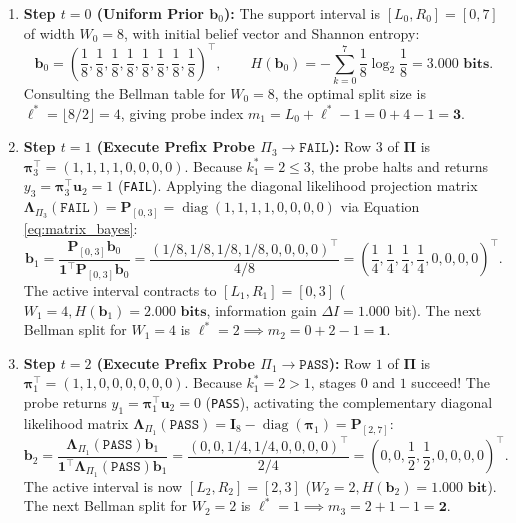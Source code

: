 \documentclass[11pt,a4paper]{article}
\theoremstyle{definition}
\theoremstyle{remark}
\begin{document}
\begin{enumerate}
    \item \textbf{Step $t=0$ (Uniform Prior $\bm{b}_0$):}
    The support interval is $[L_0, R_0] = [0, 7]$ of width $W_0 = 8$, with initial belief vector and Shannon entropy:
    \begin{equation}
        \bm{b}_0 = \left(\frac{1}{8}, \frac{1}{8}, \frac{1}{8}, \frac{1}{8}, \frac{1}{8}, \frac{1}{8}, \frac{1}{8}, \frac{1}{8}\right)^\top, \qquad H(\bm{b}_0) = -\sum_{k=0}^{7} \frac{1}{8}\log_2\frac{1}{8} = \mathbf{3.000\text{ bits}}.
    \end{equation}
    Consulting the Bellman table for $W_0 = 8$, the optimal split size is $\ell^* = \lfloor 8/2 \rfloor = 4$, giving probe index $m_1 = L_0 + \ell^* - 1 = 0 + 4 - 1 = \mathbf{3}$.

    \item \textbf{Step $t=1$ (Execute Prefix Probe $\Pi_3 \to \texttt{FAIL}$):}
    Row $3$ of $\mathbf{\Pi}$ is $\bm{\pi}_3^\top = (1, 1, 1, 1, 0, 0, 0, 0)$. Because $k_1^* = 2 \le 3$, the probe halts and returns $y_3 = \bm{\pi}_3^\top \bm{u}_2 = 1$ (\texttt{FAIL}). Applying the diagonal likelihood projection matrix $\mathbf{\Lambda}_{\Pi_3}(\texttt{FAIL}) = \mathbf{P}_{[0,3]} = \operatorname{diag}(1, 1, 1, 1, 0, 0, 0, 0)$ via Equation \eqref{eq:matrix_bayes}:
    \begin{equation}
        \bm{b}_1 = \frac{\mathbf{P}_{[0,3]} \bm{b}_0}{\bm{1}^\top \mathbf{P}_{[0,3]} \bm{b}_0} = \frac{(1/8, 1/8, 1/8, 1/8, 0, 0, 0, 0)^\top}{4/8} = \left(\frac{1}{4}, \frac{1}{4}, \frac{1}{4}, \frac{1}{4}, 0, 0, 0, 0\right)^\top.
    \end{equation}
    The active interval contracts to $[L_1, R_1] = [0, 3]$ ($W_1 = 4, H(\bm{b}_1) = \mathbf{2.000\text{ bits}}$, information gain $\Delta I = 1.000$ bit). The next Bellman split for $W_1 = 4$ is $\ell^* = 2 \implies m_2 = 0 + 2 - 1 = \mathbf{1}$.

    \item \textbf{Step $t=2$ (Execute Prefix Probe $\Pi_1 \to \texttt{PASS}$):}
    Row $1$ of $\mathbf{\Pi}$ is $\bm{\pi}_1^\top = (1, 1, 0, 0, 0, 0, 0, 0)$. Because $k_1^* = 2 > 1$, stages $0$ and $1$ succeed! The probe returns $y_1 = \bm{\pi}_1^\top \bm{u}_2 = 0$ (\texttt{PASS}), activating the complementary diagonal likelihood matrix $\mathbf{\Lambda}_{\Pi_1}(\texttt{PASS}) = \mathbf{I}_8 - \operatorname{diag}(\bm{\pi}_1) = \mathbf{P}_{[2,7]}$:
    \begin{equation}
        \bm{b}_2 = \frac{\mathbf{\Lambda}_{\Pi_1}(\texttt{PASS}) \bm{b}_1}{\bm{1}^\top \mathbf{\Lambda}_{\Pi_1}(\texttt{PASS}) \bm{b}_1} = \frac{(0, 0, 1/4, 1/4, 0, 0, 0, 0)^\top}{2/4} = \left(0, 0, \frac{1}{2}, \frac{1}{2}, 0, 0, 0, 0\right)^\top.
    \end{equation}
    The active interval is now $[L_2, R_2] = [2, 3]$ ($W_2 = 2, H(\bm{b}_2) = \mathbf{1.000\text{ bit}}$). The next Bellman split for $W_2 = 2$ is $\ell^* = 1 \implies m_3 = 2 + 1 - 1 = \mathbf{2}$.


\end{enumerate}
\end{document}
